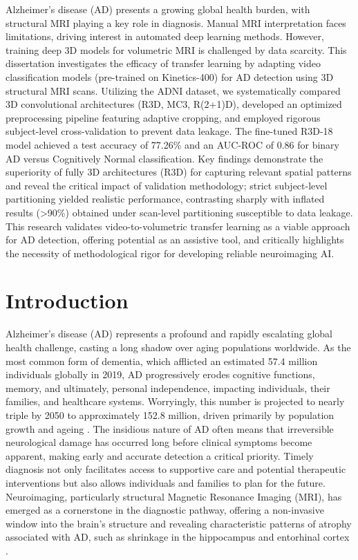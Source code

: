 \documentclass[11pt, a4paper]{article}
\begin{document}
Alzheimer's disease (AD) presents a growing global health burden, with structural MRI playing a key role in diagnosis. Manual MRI interpretation faces limitations, driving interest in automated deep learning methods. However, training deep 3D models for volumetric MRI is challenged by data scarcity. This dissertation investigates the efficacy of transfer learning by adapting video classification models (pre-trained on Kinetics-400) for AD detection using 3D structural MRI scans. Utilizing the ADNI dataset, we systematically compared 3D convolutional architectures (R3D, MC3, R(2+1)D), developed an optimized preprocessing pipeline featuring adaptive cropping, and employed rigorous subject-level cross-validation to prevent data leakage. The fine-tuned R3D-18 model achieved a test accuracy of 77.26\% and an AUC-ROC of 0.86 for binary AD versus Cognitively Normal classification. Key findings demonstrate the superiority of fully 3D architectures (R3D) for capturing relevant spatial patterns and reveal the critical impact of validation methodology; strict subject-level partitioning yielded realistic performance, contrasting sharply with inflated results (>90\%) obtained under scan-level partitioning susceptible to data leakage. This research validates video-to-volumetric transfer learning as a viable approach for AD detection, offering potential as an assistive tool, and critically highlights the necessity of methodological rigor for developing reliable neuroimaging AI.


\section{Introduction}

Alzheimer's disease (AD) represents a profound and rapidly escalating global health challenge, casting a long shadow over aging populations worldwide. As the most common form of dementia, which afflicted an estimated 57.4 million individuals globally in 2019, AD progressively erodes cognitive functions, memory, and ultimately, personal independence, impacting individuals, their families, and healthcare systems. Worryingly, this number is projected to nearly triple by 2050 to approximately 152.8 million, driven primarily by population growth and ageing \cite{nichols2022estimation}. The insidious nature of AD often means that irreversible neurological damage has occurred long before clinical symptoms become apparent, making early and accurate detection a critical priority. Timely diagnosis not only facilitates access to supportive care and potential therapeutic interventions but also allows individuals and families to plan for the future. Neuroimaging, particularly structural Magnetic Resonance Imaging (MRI), has emerged as a cornerstone in the diagnostic pathway, offering a non-invasive window into the brain's structure and revealing characteristic patterns of atrophy associated with AD, such as shrinkage in the hippocampus and entorhinal cortex \cite{vemuri2010role, frisoni2010clinical}.
\end{document}
